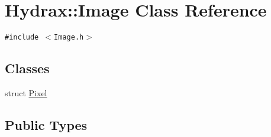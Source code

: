 \hypertarget{class_hydrax_1_1_image}{
\section{Hydrax::Image Class Reference}
\label{class_hydrax_1_1_image}
}
{\tt \#include $<$Image.h$>$}

\subsection*{Classes}
\begin{CompactItemize}
\item 
struct \hyperlink{struct_hydrax_1_1_image_1_1_pixel}{Pixel}
\end{CompactItemize}
\subsection*{Public Types}
